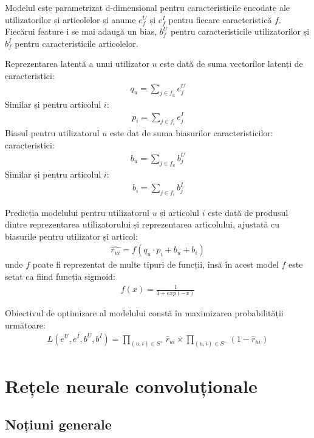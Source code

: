 Modelul este parametrizat d-dimensional pentru caracteristicile encodate ale utilizatorilor și articolelor și anume $e_f^U$ și $e_f^I$ pentru fiecare caracteristică $f$. Fiecărui feature i se mai adaugă un bias, $b_f^U$ pentru caracteristicile utilizatorilor și $b_f^I$ pentru caracteristicile articolelor.

Reprezentarea latentă a unui utilizator $u$ este dată de suma vectorilor latenți de caracteristici:
\begin{align}
	q_u = \sum_{j \in f_u} e_j^U
\end{align}
Similar și pentru articolul $i$:
\begin{align}
	p_i = \sum_{j \in f_i} e_j^I
\end{align}
Biasul pentru utilizatorul $u$ este dat de suma biasurilor caracteristicilor:
caracteristici:
\begin{align}
	b_u = \sum_{j \in f_u} b_j^U
\end{align}
Similar și pentru articolul $i$:
\begin{align}
	b_i = \sum_{j \in f_i} b_j^I
\end{align}

Predicția modelului pentru utilizatorul $u$ și articolul $i$ este dată de produsul dintre reprezentarea utilizatorului și reprezentarea articolului, ajustată cu biasurile pentru utilizator și articol:
\begin{align}
	\hat{r_{ui}} = f(q_u \cdot p_i + b_u + b_i)
\end{align}
unde $f$ poate fi reprezentat de multe tipuri de funcții, însă în acest model $f$ este setat ca fiind funcția sigmoid:
\begin{align}
	f(x) = \frac{1}{1 + exp(-x)}
\end{align}

Obiectivul de optimizare al modelului constă în maximizarea probabilității următoare:
\begin{align}
	L(e^U, e^I, b^U, b^I) = \prod_{(u,i) \in S^+} \hat{r}_{ui} \times \prod_{(u,i) \in S^-} (1 -\hat{r}_{ui})
\end{align}

\section{Rețele neurale convoluționale}

\subsection{Noțiuni generale}

